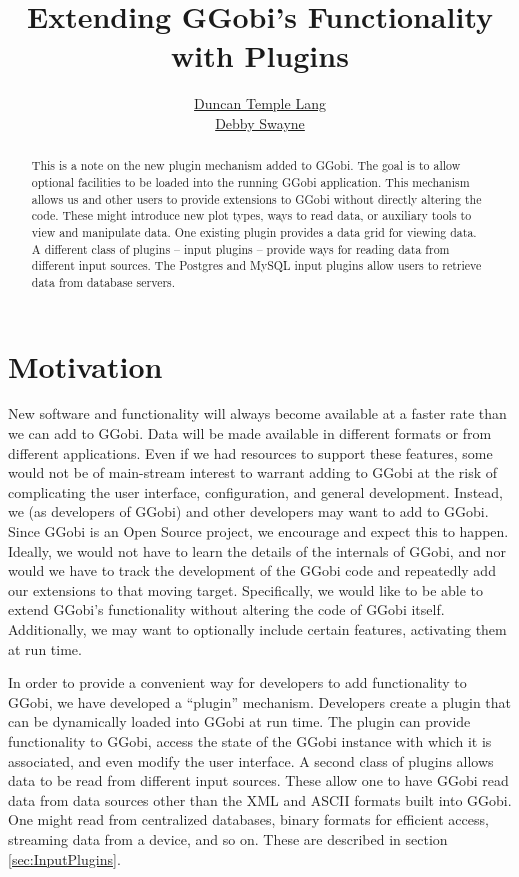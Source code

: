 \documentclass{article}
\title{Extending GGobi's Functionality with Plugins}
\author{\href{http://cm.bell-labs.com/stat/duncan}{Duncan Temple Lang}\\
\href{http://www.research.att.com/~dfs}{Debby Swayne}
}
\begin{document}
\maketitle
\begin{abstract}
  This is a note on the new plugin mechanism added to GGobi. The goal
  is to allow optional facilities to be loaded into the running GGobi
  application.  This mechanism allows us and other users to provide
  extensions to GGobi without directly altering the code. These might
  introduce new plot types, ways to read data, or auxiliary tools to
  view and manipulate data.  One existing plugin provides a data grid
  for viewing data. A different class of plugins -- input plugins --
  provide ways for reading data from different input sources.  The
  Postgres and MySQL input plugins allow users to retrieve data from
  database servers.
\end{abstract}

\section{Motivation}
New software and functionality will always become available at a
faster rate than we can add to GGobi. Data will be made available in
different formats or from different applications. Even if we had
resources to support these features, some would not be of main-stream
interest to warrant adding to GGobi at the risk of complicating the
user interface, configuration, and general development. Instead, we
(as developers of GGobi) and other developers may want to add to
GGobi.  Since GGobi is an Open Source project, we encourage and expect
this to happen.  Ideally, we would not have to learn the details of
the internals of GGobi, and nor would we have to track the development
of the GGobi code and repeatedly add our extensions to that moving
target.  Specifically, we would like to be able to extend GGobi's
functionality without altering the code of GGobi itself.
Additionally, we may want to optionally include certain features,
activating them at run time.

In order to provide a convenient way for developers to add
functionality to GGobi, we have developed a ``plugin'' mechanism.
Developers create a plugin that can be dynamically loaded into GGobi
at run time. The plugin can provide functionality to GGobi, access the
state of the GGobi instance with which it is associated, and even
modify the user interface. 
A second class of plugins allows data to be read from different
input sources. These allow one to have GGobi read data from
data sources other than the XML and ASCII formats 
built into GGobi. One might read from centralized databases, binary 
formats for efficient access, streaming data from a device, and so on.
These are described in section \ref{sec:InputPlugins}.
\end{document}
